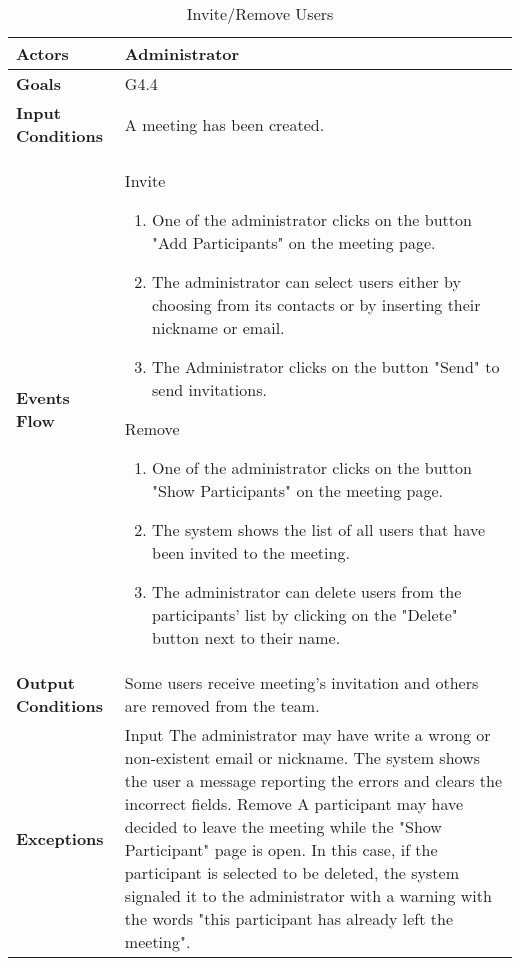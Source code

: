 \begin{table}[H]
	\centering
	\def\arraystretch{1.5}
	\begin{tabular}{|p{7cm}|p{7cm}|}
		\hline
		\textbf{Actors}            & Administrator    \\ \hline
		\textbf{Goals}             & G4.4           \\ \hline
		\textbf{Input Conditions}  & A meeting has been created.           \\ \hline
		\textbf{Events Flow}       & Invite 
		\begin{enumerate}[topsep=0pt, leftmargin=*]
			\item One of the administrator clicks on the button "Add Participants" on the meeting page.
			\item The administrator can select users either by choosing from its contacts or by inserting their nickname or email.
			\item The Administrator clicks on the button "Send" to send invitations.
		\end{enumerate}   
		Remove 
		\begin{enumerate}[topsep=0pt, leftmargin=*]
			\item One of the administrator clicks on the button "Show Participants" on the meeting page.
			\item The system shows the list of all users that have been invited to the meeting.
			\item The administrator can delete users from the participants' list by clicking on the "Delete" button next to their name.
		\end{enumerate}            \\ \hline
		\textbf{Output Conditions} & Some users receive meeting's invitation and others are removed from the team.            \\ \hline
		\textbf{Exceptions}        & Input \newline
		The administrator may have write a wrong or non-existent email or nickname. The system shows the user a message reporting the errors and
		clears the incorrect fields. \newline
		Remove \newline
		A participant may have decided to leave the meeting while the "Show Participant" page is open. In this case, if the participant is selected to be deleted, the system signaled it to the administrator with a warning with the words "this participant has already left the meeting".         \\ \hline
	\end{tabular}
	\caption{Invite/Remove Users}
\end{table}

